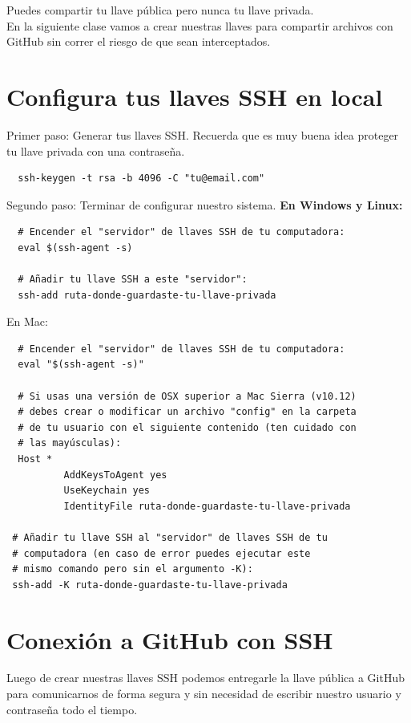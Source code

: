 \documentclass{article}
\begin{document}
Puedes compartir tu llave pública pero nunca tu llave privada.\\

En la siguiente clase vamos a crear nuestras llaves para compartir archivos con
GitHub sin correr el riesgo de que sean interceptados.\\


\section{Configura tus llaves SSH en local}%
Primer paso: Generar tus llaves SSH. Recuerda que es muy buena idea proteger tu
llave privada con una contraseña.

\begin{verbatim}
  ssh-keygen -t rsa -b 4096 -C "tu@email.com"
\end{verbatim}

Segundo paso: Terminar de configurar nuestro sistema.
\textbf{En Windows y Linux:}
\begin{verbatim}
  # Encender el "servidor" de llaves SSH de tu computadora:
  eval $(ssh-agent -s)

  # Añadir tu llave SSH a este "servidor":
  ssh-add ruta-donde-guardaste-tu-llave-privada
\end{verbatim}

En Mac:

\begin{verbatim}
  # Encender el "servidor" de llaves SSH de tu computadora:
  eval "$(ssh-agent -s)"

  # Si usas una versión de OSX superior a Mac Sierra (v10.12)
  # debes crear o modificar un archivo "config" en la carpeta
  # de tu usuario con el siguiente contenido (ten cuidado con
  # las mayúsculas):
  Host *
          AddKeysToAgent yes
          UseKeychain yes
          IdentityFile ruta-donde-guardaste-tu-llave-privada

 # Añadir tu llave SSH al "servidor" de llaves SSH de tu
 # computadora (en caso de error puedes ejecutar este
 # mismo comando pero sin el argumento -K):
 ssh-add -K ruta-donde-guardaste-tu-llave-privada
\end{verbatim}

\section{Conexión a GitHub con SSH}%
Luego de crear nuestras llaves SSH podemos entregarle la llave pública a GitHub
para comunicarnos de forma segura y sin necesidad de escribir nuestro usuario y
contraseña todo el tiempo.\\
\end{document}
